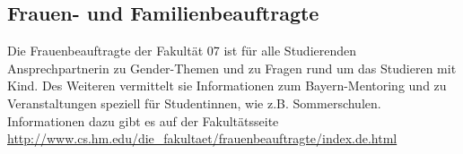 \subsection{Frauen- und Familienbeauftragte}
Die Frauenbeauftragte der Fakultät 07 ist für alle Studierenden 
Ansprechpartnerin zu Gender-Themen und zu Fragen rund um das 
Studieren mit Kind. Des Weiteren vermittelt sie Informationen zum 
Bayern-Mentoring und zu Veranstaltungen speziell für Studentinnen, 
wie z.B. Sommerschulen. Informationen dazu gibt es auf der 
Fakultätsseite\doublebreak
\url{http://www.cs.hm.edu/die_fakultaet/frauenbeauftragte/index.de.html}